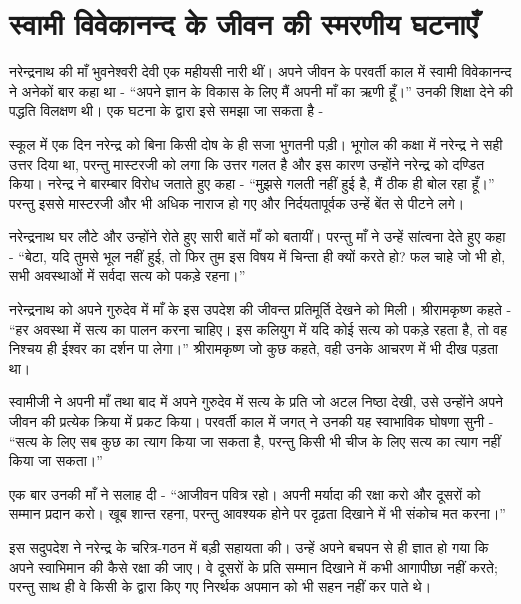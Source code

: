
\chapter{स्वामी विवेकानन्द के जीवन की स्मरणीय घटनाएँ }

नरेन्द्रनाथ की माँ भुवनेश्वरी देवी एक महीयसी नारी थीं। अपने जीवन के परवर्ती काल में स्वामी विवेकानन्द ने अनेकों बार कहा था - “अपने ज्ञान के विकास के लिए मैं अपनी माँ का ऋणी हूँ।” उनकी शिक्षा देने की पद्धति विलक्षण थी। एक घटना के द्वारा इसे समझा जा सकता है - 

\vskip 1.5pt

स्कूल में एक दिन नरेन्द्र को बिना किसी दोष के ही सजा भुगतनी पड़ी। भूगोल की कक्षा में नरेन्द्र ने सही उत्तर दिया था, परन्तु मास्टरजी को लगा कि उत्तर गलत है और इस कारण उन्होंने नरेन्द्र को दण्डित किया। नरेन्द्र ने बारम्बार विरोध जताते हुए कहा - “मुझसे गलती नहीं हुई है, मैं ठीक ही बोल रहा हूँ।” परन्तु इससे मास्टरजी और भी अधिक नाराज हो गए और निर्दयतापूर्वक उन्हें बेंत से पीटने लगे। 

\vskip 1.5pt

नरेन्द्रनाथ घर लौटे और उन्होंने रोते हुए सारी बातें माँ को बतायीं। परन्तु माँ ने उन्हें सांत्वना देते हुए कहा - “बेटा, यदि तुमसे भूल नहीं हुई, तो फिर तुम इस विषय में चिन्ता ही क्यों करते हो? फल चाहे जो भी हो, सभी अवस्थाओं में सर्वदा सत्य को पकड़े रहना।” 

\vskip 1.5pt

नरेन्द्रनाथ को अपने गुरुदेव में माँ के इस उपदेश की जीवन्त प्रतिमूर्ति देखने को मिली। श्रीरामकृष्ण कहते - “हर अवस्था में सत्य का पालन करना चाहिए। इस कलियुग में यदि कोई सत्य को पकड़े रहता है, तो वह निश्चय ही ईश्वर का दर्शन पा लेगा।” श्रीरामकृष्ण जो कुछ कहते, वही उनके आचरण में भी दीख पड़ता था। 

\vskip 1.5pt

स्वामीजी ने अपनी माँ तथा बाद में अपने गुरुदेव में सत्य के प्रति जो अटल निष्ठा देखी, उसे उन्होंने अपने जीवन की प्रत्येक क्रिया में प्रकट किया। परवर्ती काल में जगत् ने उनकी यह स्वाभाविक घोषणा सुनी - “सत्य के लिए सब कुछ का त्याग किया जा सकता है, परन्तु किसी भी चीज के लिए सत्य का त्याग नहीं किया जा सकता।” 

\delimiter

एक बार उनकी माँ ने सलाह दी - “आजीवन पवित्र रहो। अपनी मर्यादा की रक्षा करो और दूसरों को सम्मान प्रदान करो। खूब शान्त रहना, परन्तु आवश्यक होने पर दृढ़ता दिखाने में भी संकोच मत करना।” 

\vskip 1.5pt

इस सदुपदेश ने नरेन्द्र के चरित्र-गठन में बड़ी सहायता की। उन्हें अपने बचपन से ही ज्ञात हो गया कि अपने स्वाभिमान की कैसे रक्षा की जाए। वे दूसरों के प्रति सम्मान दिखाने में कभी आगापीछा नहीं करते; परन्तु साथ ही वे किसी के द्वारा किए गए निरर्थक अपमान को भी सहन नहीं कर पाते थे। 

